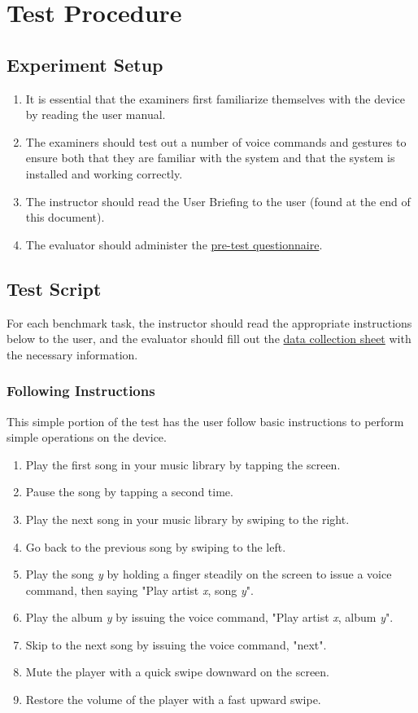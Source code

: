 \documentclass[12pt,letterpaper]{article}
\begin{document}
\section{Test Procedure}

\subsection{Experiment Setup}

\begin{enumerate}
\item It is essential that the examiners first familiarize themselves with the device by reading the user manual.
\item The examiners should test out a number of voice commands and gestures to ensure both that they are familiar with the system and that the system is installed and working correctly.
\item The instructor should read the User Briefing to the user (found at the end of this document).
\item The evaluator should administer the \href{http://fluidsurveys.com/s/hciplayer-pretest/}{pre-test questionnaire}.
\end{enumerate}

\subsection{Test Script}

For each benchmark task, the instructor should read the appropriate instructions below to the user, and the evaluator should fill out the \href{http://fluidsurveys.com/s/hciplayer-datacollectionsheet/}{data collection sheet} with the necessary information.

\subsubsection{Following Instructions}
This simple portion of the test has the user follow basic instructions to perform simple operations on the device.
\begin{enumerate}
\item Play the first song in your music library by tapping the screen.
\item Pause the song by tapping a second time.
\item Play the next song in your music library by swiping to the right.
\item Go back to the previous song by swiping to the left.
\item Play the song \textit{y} by holding a finger steadily on the screen to issue a voice command, then saying "Play artist \textit{x}, song \textit{y}".
\item Play the album \textit{y} by issuing the voice command, "Play artist \textit{x}, album \textit{y}".
\item Skip to the next song by issuing the voice command, "next".
\item Mute the player with a quick swipe downward on the screen.
\item Restore the volume of the player with a fast upward swipe.
\end{enumerate}
\end{document}
